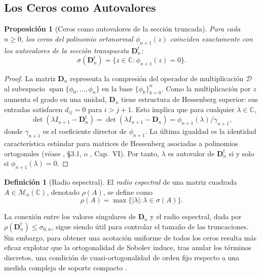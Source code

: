 \documentclass[12pt,a4paper]{article}
\newtheorem{proposition}{Proposición}
\theoremstyle{definition}
\newtheorem{definition}{Definición}
\theoremstyle{remark}
\newcommand{\C}{\mathbb{C}}
\newcommand{\D}{\mathcal{D}}
\begin{document}
\subsection{Los Ceros como Autovalores}

\begin{proposition}[Ceros como autovalores de la sección truncada]\label{prop:autovalores_ceros}
  Para cada $n \ge 0$, los ceros del polinomio ortonormal $\phi_{n+1}(z)$ coinciden exactamente con los autovalores de la sección transpuesta $\mathbf{D}_n^t$:
  \[
    \sigma(\mathbf{D}_n^t) = \{z \in \mathbb{C} : \phi_{n+1}(z) = 0\}.
  \]
\end{proposition}

\begin{proof}
  La matriz $\mathbf{D}_n$ representa la compresión del operador de multiplicación $\D$ al subespacio $\operatorname{span}\{\phi_0,\dots,\phi_n\}$ en la base $\{\phi_k\}_{k=0}^n$. Como la multiplicación por $z$ aumenta el grado en una unidad, $\mathbf{D}_n$ tiene estructura de Hessenberg superior: sus entradas satisfacen $d_{ij}=0$ para $i>j+1$. Esto implica que para cualquier $\lambda\in\C$,
  \[
    \det(\lambda I_{n+1}-\mathbf{D}_n^t)=\det(\lambda I_{n+1}-\mathbf{D}_n)
    =\phi_{n+1}(\lambda)/\gamma_{n+1},
  \]
  donde $\gamma_{n+1}$ es el coeficiente director de $\phi_{n+1}$. La última igualdad es la identidad característica estándar para matrices de Hessenberg asociadas a polinomios ortogonales (véase \cite{szego1975orthogonal}, §3.1, o \cite{gohberg1969introduction}, Cap.~VI). Por tanto, $\lambda$ es autovalor de $\mathbf{D}_n^t$ si y solo si $\phi_{n+1}(\lambda)=0$.
\end{proof}

\begin{definition}[Radio espectral]\label{def:radio_espectral}
  El \emph{radio espectral} de una matriz cuadrada $A \in \mathcal{M}_n(\mathbb{C})$, denotado $\rho(A)$, se define como
  \[
    \rho(A) = \max\{|\lambda| : \lambda \in \sigma(A)\}.
  \]
\end{definition}

La conexión entre los valores singulares de $\mathbf{D}_n$ y el radio espectral, dada por $\rho(\mathbf{D}_n^t) \le \sigma_{0,n}$, sigue siendo útil para controlar el tamaño de las truncaciones. Sin embargo, para obtener una acotación uniforme de todos los ceros resulta más eficaz explotar que la ortogonalidad de Sobolev induce, tras anular los términos discretos, una condición de cuasi-ortogonalidad de orden fijo respecto a una medida compleja de soporte compacto \cite{lopez1999zero,marcellan2015sobolev}.
\end{document}
